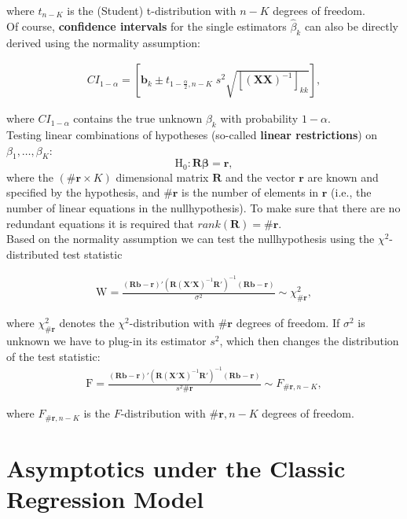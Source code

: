 \documentclass[]{book}
\theoremstyle{definition}
\theoremstyle{definition}
\theoremstyle{definition}
\theoremstyle{remark}
\begin{document}
where \(t_{n-K}\) is the (Student) t-distribution with \(n-K\) degrees of
freedom.\\
Of course, \textbf{confidence intervals} for the single estimators
\(\hat\beta_k\) can also be directly derived using the normality
assumption:

\[
\begin{align*}
  CI_{1-\alpha} = \left[\mathbf{b}_k\pm t_{1-\frac{\alpha}{2},n-K}\;s^2\sqrt{\left[(\mathbf{X}\mathbf{X})^{-1}\right]_{kk}}\right],
\end{align*}
\]

where \(CI_{1-\alpha}\) contains the true unknown \(\beta_k\) with
probability \(1-\alpha\).\\
Testing linear combinations of hypotheses (so-called \textbf{linear
restrictions}) on \(\beta_1,\dots,\beta_K\):
\[\text{H}_0: \mathbf{R}\boldsymbol{\beta}=\mathbf{r},\] where the
\((\#\mathbf{r}\times K)\) dimensional matrix \(\mathbf{R}\) and the vector
\(\mathbf{r}\) are known and specified by the hypothesis, and
\(\#\mathbf{r}\) is the number of elements in \(\mathbf{r}\) (i.e., the
number of linear equations in the nullhypothesis). To make sure that
there are no redundant equations it is required that
\(rank(\mathbf{R})=\#\mathbf{r}\).\\
Based on the normality assumption we can test the nullhypothesis using
the \(\chi^2\)-distributed test statistic

\[
\begin{align*}
  \text{W}=\frac{(\mathbf{R}\mathbf{b}-\mathbf{r})'(\mathbf{R}(\mathbf{X}'\mathbf{X})^{-1}\mathbf{R}')^{-1}(\mathbf{R}\mathbf{b}-\mathbf{r})}{\sigma^2}\sim \chi^2_{\#\mathbf{r}},
\end{align*}
\]

where \(\chi^2_{\#\mathbf{r}}\) denotes the \(\chi^2\)-distribution with
\(\#\mathbf{r}\) degrees of freedom. If \(\sigma^2\) is unknown we have to
plug-in its estimator \(s^2\), which then changes the distribution of the
test statistic:
\[
\begin{align*}
  \text{F}=\frac{(\mathbf{R}\mathbf{b}-\mathbf{r})'(\mathbf{R}(\mathbf{X}'\mathbf{X})^{-1}\mathbf{R}')^{-1}(\mathbf{R}\mathbf{b}-\mathbf{r})}{s^2 \#\mathbf{r}}\sim F_{\#\mathbf{r},n-K},
\end{align*}
\]

where \(F_{\#\mathbf{r},n-K}\) is the \(F\)-distribution with
\(\#\mathbf{r},n-K\) degrees of freedom.

\hypertarget{asymptotics-under-the-classic-regression-model}{%
\section{Asymptotics under the Classic Regression Model}\label{asymptotics-under-the-classic-regression-model}}
\end{document}
